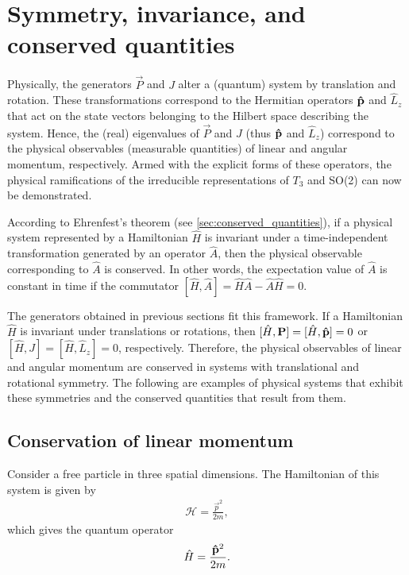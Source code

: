 \section{Symmetry, invariance, and conserved quantities}\label{sec:PJ_physical}

Physically, the generators $\vec{P}$ and $J$ alter a (quantum) system by translation and rotation. These transformations correspond to the Hermitian operators $\mathbf{\hat{p}}$ and $\hat{L}_z$ that act on the state vectors belonging to the Hilbert space describing the system. Hence, the (real) eigenvalues of $\vec{P}$ and $J$ (thus $\mathbf{\hat{p}}$ and $\hat{L}_z$) correspond to the physical observables (measurable quantities) of linear and angular momentum, respectively. Armed with the explicit forms of these operators, the physical ramifications of the irreducible representations of $T_3$ and SO(2) can now be demonstrated.

According to Ehrenfest's theorem (see \cref{sec:conserved_quantities}), if a physical system represented by a Hamiltonian $\hat{H}$ is invariant under a time-independent transformation generated by an operator $\hat{A}$, then the physical observable corresponding to $\hat{A}$ is conserved. In other words, the expectation value of $\hat{A}$ is constant in time if the commutator $[\hat{H},\hat{A}] = \hat{H}\hat{A} - \hat{A}\hat{H} = 0$.

The generators obtained in previous sections fit this framework. If a Hamiltonian $\hat{H}$ is invariant under translations or rotations, then $[\hat{H}, \mathbf{P}] = [\hat{H},\mathbf{\hat{p}}] = 0$ or $[\hat{H}, J] = [\hat{H}, \hat{L}_z] = 0$, respectively. Therefore, the physical observables of linear and angular momentum are conserved in systems with translational and rotational symmetry. The following are examples of physical systems that exhibit these symmetries and the conserved quantities that result from them.

\subsection{Conservation of linear momentum}
Consider a free particle in three spatial dimensions. The Hamiltonian of this system is given by
\begin{align*}
    \mathcal{H} = \frac{\vec{p}^2}{2m},
\end{align*}
which gives the quantum operator
\begin{align*}
    \hat{H} = \frac{\mathbf{\hat{p}}^2}{2m}.
\end{align*}

